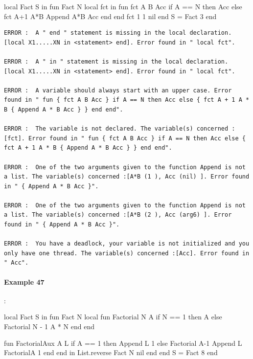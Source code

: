 \documentclass[11pt,a4paper,twoside,openright]{report}
\begin{document}
\begin{OZ}

local Fact S in 
	fun {Fact N}
		local fct in
			fun {fct A B Acc}
			    if A == N then Acc
			    else {fct A+1 A*B {Append A*B Acc}}
			    end
			end
			{fct 1 1 nil}	
		end
	S = {Fact 3}
end

\end{OZ}

\begin{lstlisting}
ERROR :  A " end " statement is missing in the local declaration. [local X1.....XN in <statement> end]. Error found in " local fct".

ERROR :  A " in " statement is missing in the local declaration. [local X1.....XN in <statement> end]. Error found in " local fct".

ERROR :  A variable should always start with an upper case. Error found in " fun { fct A B Acc } if A == N then Acc else { fct A + 1 A * B { Append A * B Acc } } end end".

ERROR :  The variable is not declared. The variable(s) concerned :[fct]. Error found in " fun { fct A B Acc } if A == N then Acc else { fct A + 1 A * B { Append A * B Acc } } end end".

ERROR :  One of the two arguments given to the function Append is not a list. The variable(s) concerned :[A*B (1 ), Acc (nil) ]. Error found in " { Append A * B Acc }".

ERROR :  One of the two arguments given to the function Append is not a list. The variable(s) concerned :[A*B (2 ), Acc (arg6) ]. Error found in " { Append A * B Acc }".

ERROR :  You have a deadlock, your variable is not initialized and you only have one thread. The variable(s) concerned :[Acc]. Error found in " Acc".
\end{lstlisting}



\paragraph{Example 47}:

\begin{OZ}

local Fact S in 
	fun {Fact N}
		local 
		    fun {Factorial N A}
		        if N == 1 then A
        			else {Factorial N - 1 A * N}
		        end
		    end
    
    	fun {FactorialAux A L}
        if A == 1 then {Append L 1}
        else {Factorial A-1 {Append L Factorial{A 1}}}
        end
    end
in
    {List.reverse {Fact N nil}}
end
		end
	S = {Fact 8}
end

\end{OZ}
\end{document}
